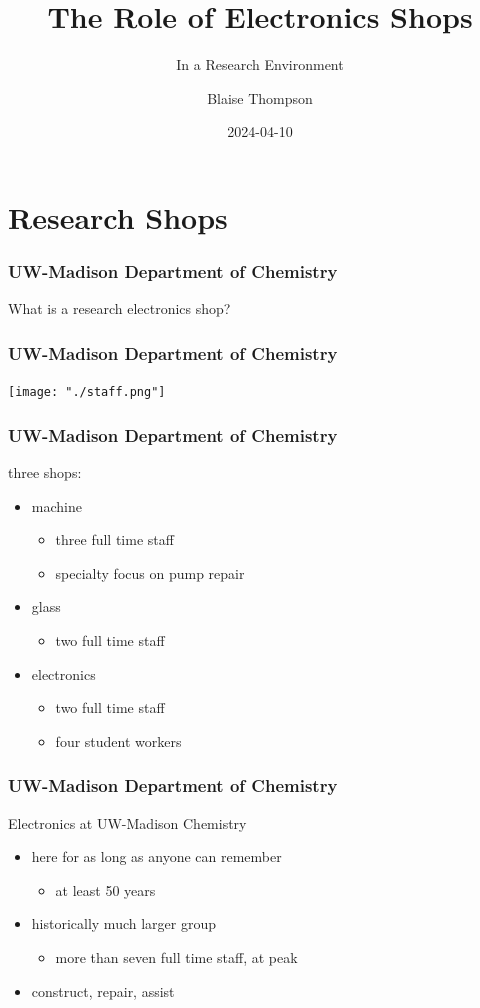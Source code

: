 \documentclass{presentation}
\title{The Role of Electronics Shops}
\subtitle{In a Research Environment}
\author{Blaise Thompson}
\institute{University of Wisconsin--Madison}
\date{2024-04-10}
\begin{document}
\maketitle

\section{Research Shops}

\begin{frame}\frametitle{UW-Madison Department of Chemistry}
  \huge
  What is a research electronics shop?
\end{frame}

\begin{frame}\frametitle{UW-Madison Department of Chemistry}
  \texttt{[image: "./staff.png"]}
\end{frame}

\begin{frame}\frametitle{UW-Madison Department of Chemistry}
  three shops:
  \begin{itemize}
    \item machine
      \begin{itemize}
        \item three full time staff
        \item specialty focus on pump repair
      \end{itemize}
    \item glass
      \begin{itemize}
        \item two full time staff
      \end{itemize}
    \item electronics
      \begin{itemize}
        \item two full time staff
        \item four student workers
      \end{itemize}
  \end{itemize}
\end{frame}

\begin{frame}\frametitle{UW-Madison Department of Chemistry}
  Electronics at UW-Madison Chemistry
  \begin{itemize}
    \item here for as long as anyone can remember
      \begin{itemize}
        \item at least 50 years
      \end{itemize}
    \item historically much larger group
      \begin{itemize}
        \item more than seven full time staff, at peak
      \end{itemize}
    \item construct, repair, assist
  \end{itemize}
\end{frame}
\end{document}
